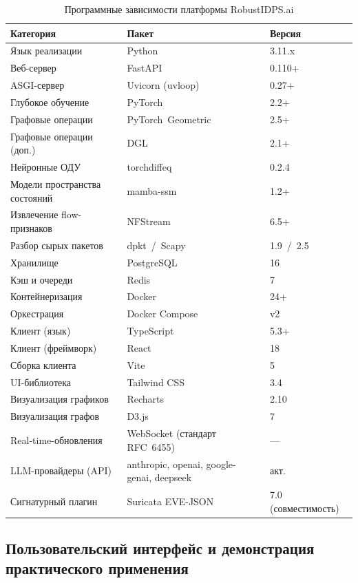 \begin{table}[H]
\centering
\caption{Программные зависимости платформы RobustIDPS.ai}
\label{tab:packages_versions}
\small
\begin{tabular}{@{}lll@{}}
\toprule
\textbf{Категория} & \textbf{Пакет} & \textbf{Версия} \\
\midrule
Язык реализации & Python & 3.11.x \\
Веб-сервер & FastAPI & 0.110+ \\
ASGI-сервер & Uvicorn (uvloop) & 0.27+ \\
Глубокое обучение & PyTorch & 2.2+ \\
Графовые операции & PyTorch~Geometric & 2.5+ \\
Графовые операции (доп.) & DGL & 2.1+ \\
Нейронные ОДУ & torchdiffeq & 0.2.4 \\
Модели пространства состояний & mamba-ssm & 1.2+ \\
Извлечение flow-признаков & NFStream & 6.5+ \\
Разбор сырых пакетов & dpkt~/~Scapy & 1.9~/~2.5 \\
Хранилище & PostgreSQL & 16 \\
Кэш и очереди & Redis & 7 \\
Контейнеризация & Docker & 24+ \\
Оркестрация & Docker Compose & v2 \\
Клиент (язык) & TypeScript & 5.3+ \\
Клиент (фреймворк) & React & 18 \\
Сборка клиента & Vite & 5 \\
UI-библиотека & Tailwind CSS & 3.4 \\
Визуализация графиков & Recharts & 2.10 \\
Визуализация графов & D3.js & 7 \\
Real-time-обновления & WebSocket (стандарт RFC~6455) & --- \\
LLM-провайдеры (API) & anthropic, openai, google-genai, deepseek & акт. \\
Сигнатурный плагин & Suricata EVE-JSON & 7.0 (совместимость) \\
\bottomrule
\end{tabular}
\end{table}

\subsection{Пользовательский интерфейс и демонстрация
практического применения}
\label{subsec:ui_walkthrough}

